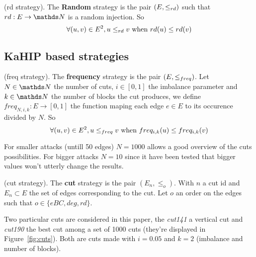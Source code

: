 \begin{definition}(rd strategy).
    The \textbf{Random} strategy is the pair $(E, \leq_{rd})$ such that $rd: E \to \N$ is a random injection. So
    $$\forall (u, v) \in E^2, u \leq_{rd} v \text{ when } rd(u) \leq rd(v)$$
\end{definition}
    
\subsection*{KaHIP based strategies}

\begin{definition}(freq strategy).
    The \textbf{frequency} strategy is the pair $(E, \leq_{freq})$. Let $N \in \N$ the number of cuts, $i \in  [0, 1]$ the imbalance parameter and $k \in \N$ the number of blocks the cut produces, we define $freq_{N, i, k}: E \to [0, 1]$ the function maping each edge $e \in E$ to its occurence divided by $N$. So
    $$\forall (u, v) \in E^2, u \leq_{freq} v \text{ when } freq_{i, k}(u) \leq freq_{i, k}(v)$$
\end{definition}
For smaller attacks (untill 50 edges) $N = 1000$ allows a good overview of the cuts possibilities. For bigger attacks $N = 10$ since it have been tested that bigger values won't utterly change the results.

\begin{definition}(cut strategy).
    The \textbf{cut} strategy is the pair $(E_n, \leq_o)$. With $n$ a cut id and $E_n \subset E$ the set of edges corresponding to the cut. Let $o$ an order on the edges such that $o \in \{eBC, deg, rd\}$.
\end{definition}
Two particular cuts are considered in this paper, the \emph{cut141} a vertical cut and \emph{cut190} the best cut among a set of 1000 cuts (they're displayed in Figure~\ref{fig:cuts}). Both are cuts made with $i = 0.05$ and $k = 2$ (imbalance and number of blocks).